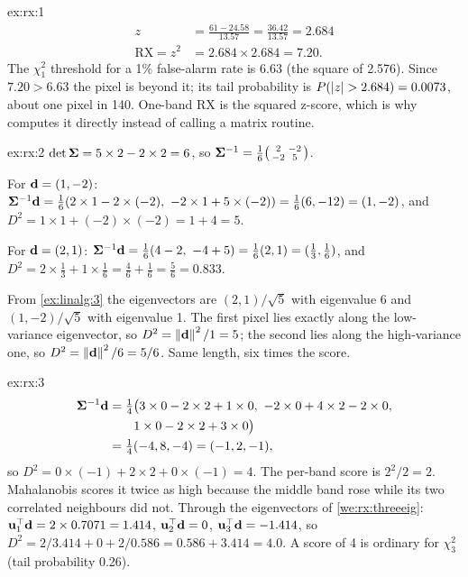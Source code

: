 
\begin{solution}{ex:rx:1}
\begin{align*}
z &= \frac{61 - 24.58}{13.57} = \frac{36.42}{13.57} = 2.684\\
\text{RX} = z^2 &= 2.684\times2.684 = 7.20 .
\end{align*}
The $\chi^2_1$ threshold for a 1\% false-alarm rate is 6.63 (the square of 2.576). Since
$7.20 > 6.63$ the pixel is beyond it; its tail probability is
$P(\left\lvert z \right\rvert > 2.684) = 0.0073$, about one pixel in 140. One-band RX is the squared z-score, which is
why  computes it directly instead of calling a matrix routine.
\end{solution}

\begin{solution}{ex:rx:2}
$\det\boldsymbol{\Sigma} = 5\times2 - 2\times2 = 6$, so
$\boldsymbol{\Sigma}^{-1} = \frac16\begin{psmallmatrix} 2 & -2\\ -2 & 5\end{psmallmatrix}$.

For $\mathbf{d} = (1, -2)$:
$\Cov\inv\vect{d} = \frac16(2\times1 - 2\times(-2),\ -2\times1 + 5\times(-2)) = \frac16(6, -12) = (1, -2)$,
and $D^2 = 1\times1 + (-2)\times(-2) = 1 + 4 = 5$.

For $\mathbf{d} = (2, 1)$:
$\boldsymbol{\Sigma}^{-1}\mathbf{d} = \frac16(4 - 2,\ -4 + 5) = \frac16(2, 1) = (\tfrac13, \tfrac16)$,
and $D^2 = 2\times\tfrac13 + 1\times\tfrac16 = \tfrac46 + \tfrac16 = \tfrac56 = 0.833$.

From \cref{ex:linalg:3} the eigenvectors are $(2, 1)/\sqrt5$ with eigenvalue 6 and $(1, -2)/\sqrt5$ with
eigenvalue 1. The first pixel lies exactly along the low-variance eigenvector, so
$D^2 = \left\lVert \mathbf{d} \right\rVert^2/1 = 5$; the second lies along the high-variance one, so
$D^2 = \left\lVert \mathbf{d} \right\rVert^2/6 = 5/6$. Same length, six times the score.
\end{solution}

\begin{solution}{ex:rx:3}
\begin{align*}
\Cov\inv\vect{d} &= \tfrac14\big(3\times0 - 2\times2 + 1\times0,\ -2\times0 + 4\times2 - 2\times0,\\
&\qquad 1\times0 - 2\times2 + 3\times0\big)\\
&=\tfrac14(-4, 8, -4) = (-1, 2, -1),
\end{align*}
so $D^2 = 0\times(-1) + 2\times2 + 0\times(-1) = 4$. The per-band score is $2^2/2 = 2$. Mahalanobis
scores it twice as high because the middle band rose while its two correlated neighbours did not.
Through the eigenvectors of \cref{we:rx:threeeig}: $\mathbf{u}_1^{\top}\mathbf{d} = 2\times0.7071 = 1.414$,
$\mathbf{u}_2^{\top}\mathbf{d} = 0$, $\mathbf{u}_3^{\top}\mathbf{d} = -1.414$, so
$D^2 = 2/3.414 + 0 + 2/0.586 = 0.586 + 3.414 = 4.0$. A score of 4 is ordinary for $\chi^2_3$ (tail
probability 0.26).
\end{solution}

